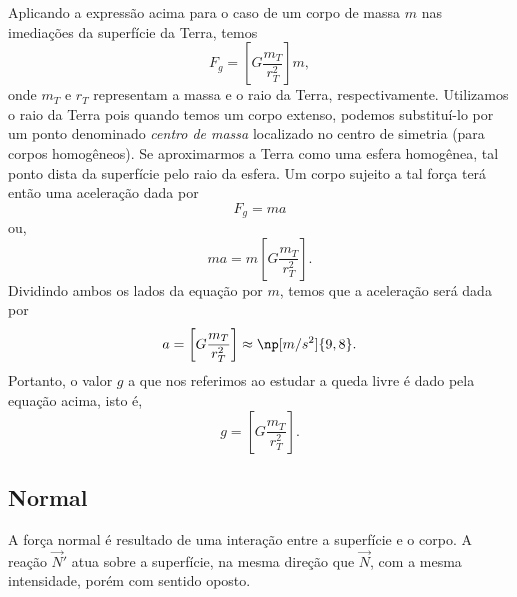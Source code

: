 Aplicando a expressão acima para o caso de um corpo de massa $m$ nas imediações da superfície da Terra, temos
\begin{equation}
  F_g = \left[G \frac{m_T}{r_T^2}\right]m,
\end{equation}
%
onde $m_T$ e $r_T$ representam a massa e o raio da Terra, respectivamente. Utilizamos o raio da Terra pois quando temos um corpo extenso, podemos substituí-lo por um ponto denominado \emph{centro de massa} localizado no centro de simetria (para corpos homogêneos). Se aproximarmos a Terra como uma esfera homogênea, tal ponto dista da superfície pelo raio da esfera. Um corpo sujeito a tal força terá então uma aceleração dada por
\begin{equation}
  F_g = ma
\end{equation}
%
ou,
\begin{equation}\label{Eq:EliminaM}
  ma = m \left[G \frac{m_T}{r_T^2}\right].
\end{equation}
%
Dividindo ambos os lados da equação por $m$, temos que a aceleração será dada por
\begin{equation}
  a = \left[G \frac{m_T}{r_T^2}\right] \approx \np[m/s^2]{9,8}.
\end{equation}
%
Portanto, o valor $g$ a que nos referimos ao estudar a queda livre é dado pela equação acima, isto é,
\begin{equation}
  g = \left[G \frac{m_T}{r_T^2}\right].
\end{equation}

\subsection{Normal} 

\begin{marginfigure}
\centering
{}
\caption{A força normal é resultado de uma interação entre a superfície e o corpo. A reação $\vec{N}'$ atua sobre a superfície, na mesma direção que $\vec{N}$, com a mesma intensidade, porém com sentido oposto.}
\end{marginfigure}

